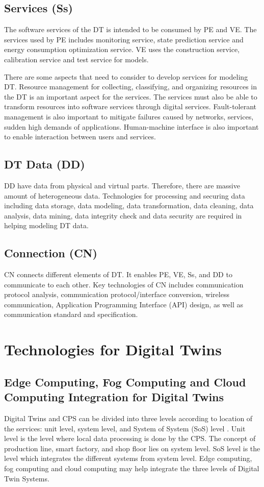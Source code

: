 \documentclass[article]{aaltoseries}
\begin{document}
\subsection{Services (Ss)}
The software services of the DT is intended to be consumed by PE and VE. The services used by PE includes monitoring service, state prediction service and energy consumption optimization service. VE uses the construction service, calibration service and test service for models.

There are some aspects that need to consider to develop services for modeling DT. Resource management for collecting, classifying, and organizing resources in the DT is an important aspect for the services. The services must also be able to transform resources into software services through digital services. Fault-tolerant management is also important to mitigate failures caused by networks, services, sudden high demands of applications. Human-machine interface is also important to enable interaction between users and services.

\subsection{DT Data (DD)}
DD have data from physical and virtual parts. Therefore, there are massive amount of heterogeneous data. Technologies for processing and securing data including data storage, data modeling, data transformation, data cleaning, data analysis, data mining, data integrity check and data security are required in helping modeling DT data.

\subsection{Connection (CN)}
CN connects different elements of DT. It enables PE, VE, Ss, and DD to communicate to each other. Key technologies of CN includes communication protocol analysis, communication protocol/interface conversion, wireless communication, Application Programming Interface (API) design, as well as communication standard and specification.



\section{Technologies for Digital Twins}
\subsection{Edge Computing, Fog Computing and Cloud Computing Integration for Digital Twins}
Digital Twins and CPS can be divided into three levels according to location of the services: unit level, system level, and System of System (SoS) level \cite{qi2018modeling}. Unit level is the level where local data processing is done by the CPS. The concept of production line, smart factory, and shop floor lies on system level. SoS level is the level which integrates the different systems from system level. Edge computing, fog computing and cloud computing may help integrate the three levels of Digital Twin Systems.
\end{document}
